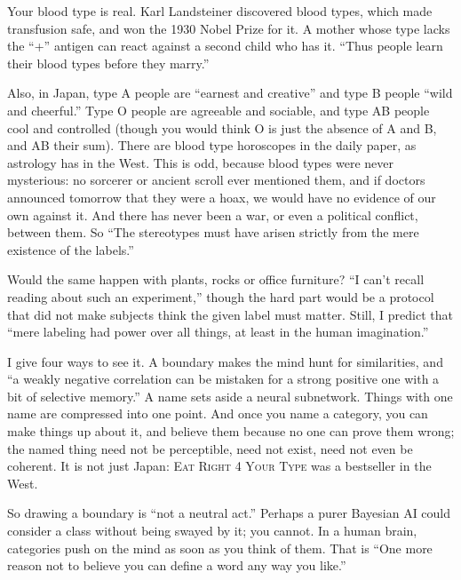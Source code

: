 
Your blood type is real. Karl Landsteiner discovered blood types, which made transfusion safe, and won the 1930 Nobel Prize for it. A mother whose type lacks the ``+'' antigen can react against a second child who has it. ``Thus people learn their blood types before they marry.''

Also, in Japan, type A people are ``earnest and creative'' and type B people ``wild and cheerful.'' Type O people are agreeable and sociable, and type AB people cool and controlled (though you would think O is just the absence of A and B, and AB their sum). There are blood type horoscopes in the daily paper, as astrology has in the West. This is odd, because blood types were never mysterious: no sorcerer or ancient scroll ever mentioned them, and if doctors announced tomorrow that they were a hoax, we would have no evidence of our own against it. And there has never been a war, or even a political conflict, between them. So ``The stereotypes must have arisen strictly from the mere existence of the labels.'' 

Would the same happen with plants, rocks or office furniture? ``I can't recall reading about such an experiment,'' though the hard part would be a protocol that did not make subjects think the given label must matter. Still, I predict that ``mere labeling had power over all things, at least in the human imagination.'' 

I give four ways to see it. A boundary makes the mind hunt for similarities, and ``a weakly negative correlation can be mistaken for a strong positive one with a bit of selective memory.'' A name sets aside a neural subnetwork. Things with one name are compressed into one point. And once you name a category, you can make things up about it, and believe them because no one can prove them wrong; the named thing need not be perceptible, need not exist, need not even be coherent.  It is not just Japan: \textsc{Eat Right 4 Your Type} was a bestseller in the West.

So drawing a boundary is ``not a neutral act.'' Perhaps a purer Bayesian AI could consider a class without being swayed by it; you cannot. In a human brain, categories push on the mind as soon as you think of them. That is ``One more reason not to believe you can define a word any way you like.''
